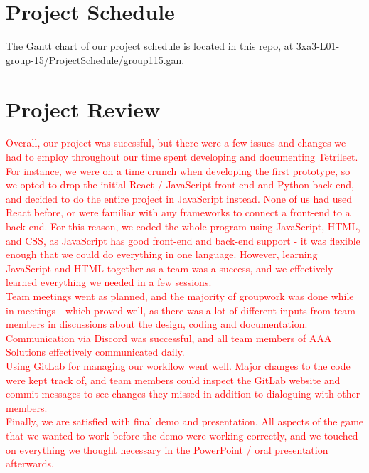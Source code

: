 \documentclass{article}
\begin{document}
\section{Project Schedule}

The Gantt chart of our project schedule is located in this repo, at 3xa3-L01-group-15/ProjectSchedule/group115.gan.

\section{Project Review}

\textcolor{red}{Overall, our project was sucessful, but there were a few issues and changes we had to employ throughout our time spent developing and documenting Tetrileet.
\\For instance, we were on a time crunch when developing the first prototype, so we opted to drop the initial React / JavaScript front-end and Python back-end, and decided to do the entire project in JavaScript instead. None of us had used React before, or were familiar with any frameworks to connect a front-end to a back-end. For this reason, we coded the whole program using JavaScript, HTML, and CSS, as JavaScript has good front-end and back-end support - it was flexible enough that we could do everything in one language. However, learning JavaScript and HTML together as a team was a success, and we effectively learned everything we needed in a few sessions.
\\Team meetings went as planned, and the majority of groupwork was done while in meetings - which proved well, as there was a lot of different inputs from team members in discussions about the design, coding and documentation.
\\Communication via Discord was successful, and all team members of AAA Solutions effectively communicated  daily.
\\ Using GitLab for managing our workflow went well. Major changes to the code were kept track of, and team members could inspect the GitLab website and commit messages to see changes they missed in addition to dialoguing with other members.
\\Finally, we are satisfied with final demo and presentation. All aspects of the game that we wanted to work before the demo were working correctly, and we touched on everything we thought necessary in the PowerPoint / oral presentation afterwards.
}
\end{document}
